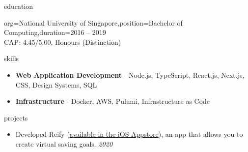 \documentclass{resume}
\begin{document}
\begin{ResumeSection}{education}
    \begin{ResumeSubsection}{org={National University of Singapore},position={Bachelor of Computing},duration={2016 -- 2019}}
            \\CAP: 4.45/5.00, Honours (Distinction)
    \end{ResumeSubsection}
\end{ResumeSection}

\begin{ResumeSection}{skills}
    \newcommand{\skill}[2]{\textbf{#1} - #2}
        \begin{itemize}
            \item \skill{Web Application Development}{Node.js, TypeScript, React.js, Next.js, CSS, Design Systems, SQL}
            \item \skill{Infrastructure}{Docker, AWS, Pulumi, Infrastructure as Code}
        \end{itemize}
\end{ResumeSection}

\begin{ResumeSection}{projects}
    \begin{itemize}
        \item Developed Reify (\href{https://apps.apple.com/us/app/reify-achieve-saving-goals/id1499847703}{available in the iOS Appstore}), an app that allows you to create virtual saving goals. \hfill\em{2020}
    \end{itemize}
\end{ResumeSection}
\end{document}
